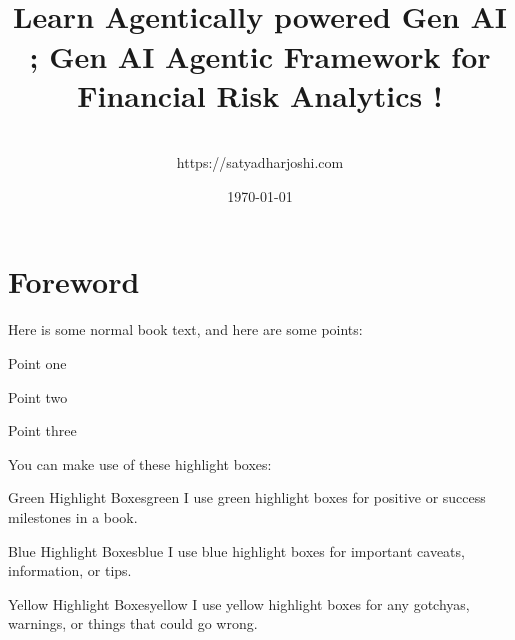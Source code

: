\documentclass[a4paper,headinclude=on,footinclude=on,12pt,oneside]{scrbook}
\begin{document}
\title{\\\small{Learn Agentically powered Gen AI ;  
		Gen AI Agentic Framework for Financial Risk Analytics !}}
\author{
    \\https://satyadharjoshi.com
}
\date{\today}

\maketitle
\tableofcontents

\listoffigures
{}

\listoflistings
{}

\chapter*{Foreword}


Here is some normal book text, and here are some points:

\begin{arrows}
\item Point one
\item Point two
\item Point three
\end{arrows}


You can make use of these highlight boxes:

\begin{highlightBox}{Green Highlight Boxes}{green}{\greenCheck}
I use green highlight boxes for positive or success milestones in a book.
\end{highlightBox}

\begin{highlightBox}{Blue Highlight Boxes}{blue}{\information}
I use blue highlight boxes for important caveats, information, or tips.
\end{highlightBox}

\begin{highlightBox}{Yellow Highlight Boxes}{yellow}{\warning}
I use yellow highlight boxes for any gotchyas, warnings, or things that could go wrong.
\end{highlightBox}
\end{document}
